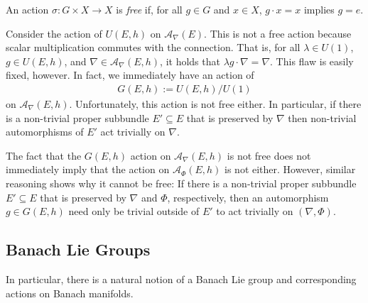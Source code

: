 \documentclass[12pt]{ociamthesis}  %
\begin{document}
\begin{definition}
  An action $\sigma : G\times X\to X$ is \emph{free} if, for all
  $g\in G$ and $x\in X$, $g\cdot x = x$ implies $g = e$.
\end{definition}

\begin{example}\label{ex:not_free}
  Consider the action of $U(E,h)$ on $\mathcal A_\nabla(E)$. This is not a free action
  because scalar multiplication commutes with the connection. That is,
  for all $\lambda\in U(1)$, $g\in U(E,h)$, and $\nabla\in \mathcal A_\nabla(E,h)$,
  it holds that $\lambda g\cdot \nabla = \nabla$. This flaw is easily fixed,
  however. In fact, we immediately have an action of
  \begin{align*}
    G(E,h) := U(E,h) / U(1)
  \end{align*}
  on $\mathcal A_\nabla(E,h)$. Unfortunately, this action is not free either. In particular,
  if there is a non-trivial proper subbundle $E'\subseteq E$ that is preserved
  by $\nabla$ then non-trivial automorphisms of $E'$ act trivially on $\nabla$.
\end{example}

\begin{example}\label{ex:not_free_double}
  The fact that the $G(E,h)$ action on $\mathcal A_\nabla(E,h)$ is not free does not
  immediately imply that the action on $\mathcal A_\Phi(E,h)$ is not either. However,
  similar reasoning shows why it cannot be free: If there is a non-trivial
  proper subbundle $E'\subseteq E$ that is preserved by $\nabla$ and $\Phi$,
  respectively, then an automorphism $g\in G(E,h)$ need only be trivial
  outside of $E'$ to act trivially on $(\nabla,\Phi)$.
\end{example}


\subsection{Banach Lie Groups}

In particular, there is a natural notion of a Banach Lie group and
corresponding actions on Banach manifolds.
\end{document}
